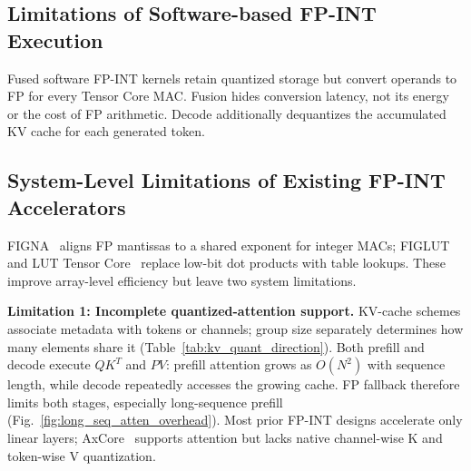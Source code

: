 \documentclass[sigconf,anonymous,nonacm]{acmart}
\newcommand{\fpint}{FP-INT}
\begin{document}
\subsection{Limitations of Software-based FP-INT Execution}


Fused software FP-INT kernels retain quantized storage but convert operands to FP for every Tensor Core MAC. Fusion hides conversion latency, not its energy or the cost of FP arithmetic. Decode additionally dequantizes the accumulated KV cache for each generated token.

\subsection{System-Level Limitations of Existing FP-INT Accelerators}
\label{sec:sys_gap}

FIGNA~\cite{figna} aligns FP mantissas to a shared exponent for integer MACs; FIGLUT~\cite{figlut} and LUT Tensor Core~\cite{lut_tensor_core} replace low-bit dot products with table lookups. These improve array-level efficiency but leave two system limitations.

\textbf{Limitation 1: Incomplete quantized-attention support.}
KV-cache schemes associate metadata with tokens or channels; group size separately determines how many elements share it (Table~\ref{tab:kv_quant_direction}). Both prefill and decode execute $QK^T$ and $PV$: prefill attention grows as $O(N^2)$ with sequence length, while decode repeatedly accesses the growing cache. FP fallback therefore limits both stages, especially long-sequence prefill (Fig.~\ref{fig:long_seq_atten_overhead}). Most prior \fpint{} designs accelerate only linear layers; AxCore~\cite{axcore} supports attention but lacks native channel-wise K and token-wise V quantization.
\end{document}
